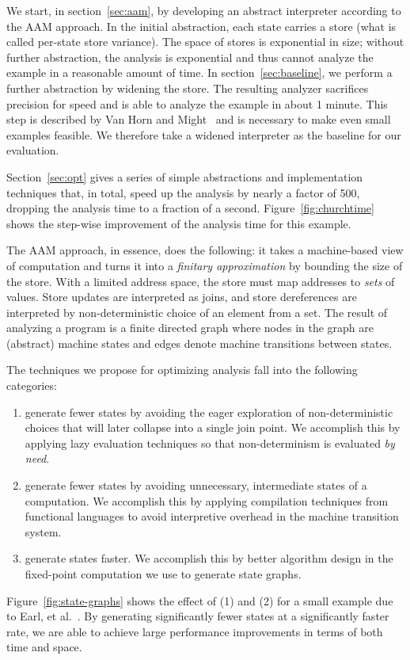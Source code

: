 \documentclass[preprint,onecolumn,9pt]{sigplanconf} %
\begin{document}
We start, in section~\ref{sec:aam}, by developing an abstract
interpreter according to the AAM approach.  In the initial
abstraction, each state carries a store (what is called per-state
store variance). The space of stores is exponential in size; without
further abstraction, the analysis is exponential and thus cannot
analyze the example in a reasonable amount of time.  In
section~\ref{sec:baseline}, we perform a further abstraction by
widening the store.  The resulting analyzer sacrifices precision for
speed and is able to analyze the example in about 1 minute.  This step
is described by Van Horn and Might~\cite[\S
3.5--6]{dvanhorn:VanHorn2012Systematic} and is necessary to make even
small examples feasible.  We therefore take a widened interpreter as
the baseline for our evaluation.

Section~\ref{sec:opt} gives a series of simple abstractions and
implementation techniques that, in total, speed up the analysis by
nearly a factor of 500, dropping the analysis time to a fraction of a
second.  Figure~\ref{fig:churchtime} shows the step-wise improvement
of the analysis time for this example.

The AAM approach, in essence, does the following: it takes a
machine-based view of computation and turns it into a \emph{finitary
  approximation} by bounding the size of the store.  With a limited
address space, the store must map addresses to \emph{sets} of values.
Store updates are interpreted as joins, and store dereferences are
interpreted by non-deterministic choice of an element from a set.  The
result of analyzing a program is a finite directed graph where nodes
in the graph are (abstract) machine states and edges denote machine
transitions between states.

The techniques we propose for optimizing analysis fall into the
following categories:
\begin{enumerate}
\item generate fewer states by avoiding the eager exploration of
  non-deterministic choices that will later collapse into a single
  join point.  We accomplish this by applying lazy evaluation
  techniques so that non-determinism is evaluated \emph{by need}.

\item generate fewer states by avoiding unnecessary, intermediate
  states of a computation.  We accomplish this by applying compilation
  techniques from functional languages to avoid interpretive overhead
  in the machine transition system.

\item generate states faster.  We accomplish this by better algorithm
  design in the fixed-point computation we use to generate state graphs.
\end{enumerate}
Figure~\ref{fig:state-graphs} shows the effect of (1) and (2) for a
small example due to Earl, et
al.~\cite{dvanhorn:Earl2012Introspective}.
By generating significantly fewer states at a significantly faster
rate, we are able to achieve large performance improvements in terms
of both time and space.
\end{document}
